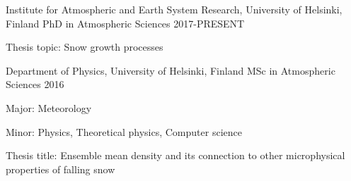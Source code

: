 

\begin{cventries}
\cventry
    {Institute for Atmospheric and Earth System Research, University of Helsinki, Finland} %
    {PhD in Atmospheric Sciences} %
    {} %
    {2017-PRESENT} %
    {
        \begin{cvitems} %
            \item {Thesis topic: Snow growth processes}
        \end{cvitems}
    }


  \cventry
    {Department of Physics, University of Helsinki, Finland} %
    {MSc in Atmospheric Sciences} %
    {} %
    {2016} %
    {
        \begin{cvitems} %
            \item {Major: Meteorology}
            \item {Minor: Physics, Theoretical physics, Computer science}
            \item {Thesis title: Ensemble mean density and its connection to other microphysical properties of falling snow}
        \end{cvitems}
    }

\end{cventries}

